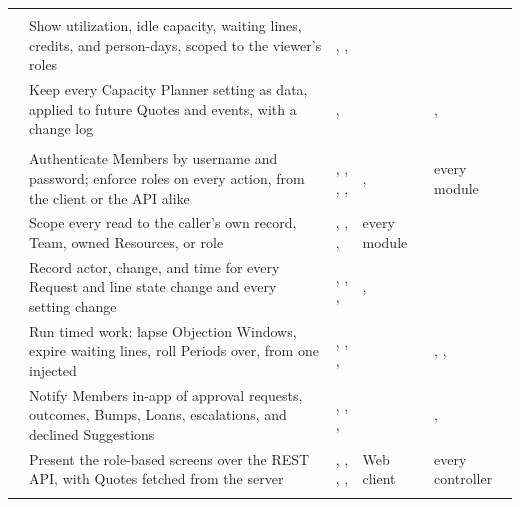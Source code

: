 {\begin{longtable}{@{}L{0.75cm}L{0.31\textwidth}L{0.29\textwidth}L{0.13\textwidth}L{\textwidth-0.75cm-8\tabcolsep\relax}@{}}
\addlinespace
{}\\
 & Show utilization, idle capacity, waiting lines, credits, and person-days, scoped to the viewer's roles & , ,  &  &  \\
 & Keep every Capacity Planner setting as data, applied to future Quotes and events, with a change log & ,  &  & ,  \\
\addlinespace
{}\\
 & Authenticate Members by username and password; enforce roles on every action, from the client or the API alike & , , , ,  & ,  & every module \\
 & Scope every read to the caller's own record, Team, owned Resources, or role & , , ,  & every module &  \\
 & Record actor, change, and time for every Request and line state change and every setting change & , , ,  & ,  &  \\
 & Run timed work: lapse Objection Windows, expire waiting lines, roll Periods over, from one injected  & , , ,  &  & , ,  \\
 & Notify Members in-app of approval requests, outcomes, Bumps, Loans, escalations, and declined Suggestions & , , ,  &  & ,  \\
 & Present the role-based screens over the REST API, with Quotes fetched from the server & , , , ,  & Web client & every controller \\
\addlinespace
{}\\

\end{longtable}}
